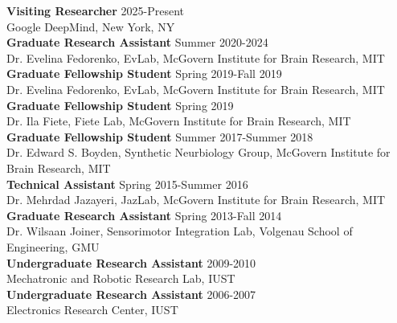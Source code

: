 \documentclass[margin, 10pt]{res}
\begin{document}
\begin{resume}
\textbf{Visiting Researcher}  \hfill 2025-Present\\ 
Google DeepMind, New York, NY
\vspace{2.5mm} \\
\textbf{Graduate Research Assistant}  \hfill Summer 2020-2024\\ 
Dr. Evelina Fedorenko, EvLab, McGovern Institute for Brain Research, MIT 
\vspace{2.5mm} \\
\textbf{Graduate Fellowship Student}  \hfill Spring 2019-Fall 2019\\ 
Dr. Evelina Fedorenko, EvLab, McGovern Institute for Brain Research, MIT 
\vspace{2.5mm} \\
\textbf{Graduate Fellowship Student}  \hfill Spring 2019\\ 
Dr. Ila Fiete, Fiete Lab, McGovern Institute for Brain Research, MIT 
\vspace{2.5mm} \\
\textbf{Graduate Fellowship Student}  \hfill Summer 2017-Summer 2018\\ 
Dr. Edward S. Boyden, Synthetic Neurbiology Group, McGovern Institute for Brain Research, MIT 
\vspace{2.5mm} \\
\textbf{Technical Assistant}  \hfill Spring 2015-Summer 2016\\ 
Dr. Mehrdad Jazayeri, JazLab, McGovern Institute for Brain Research, MIT 
\vspace{2.5mm} \\
\textbf{Graduate Research Assistant}  \hfill Spring 2013-Fall 2014\\ 
Dr. Wilsaan Joiner, Sensorimotor Integration Lab, Volgenau School of Engineering, GMU 
\vspace{2.5mm} \\
\textbf{Undergraduate Research Assistant}  \hfill 2009-2010\\ 
Mechatronic and Robotic Research Lab, IUST 
\vspace{2.5mm} \\
\textbf{Undergraduate Research Assistant}  \hfill 2006-2007\\ 
Electronics Research Center, IUST 

\end{resume}
\end{document}
